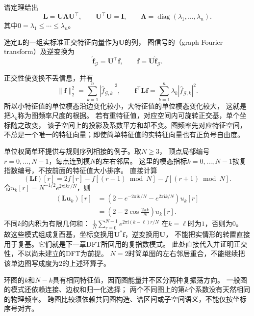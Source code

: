 谱定理给出
\[
  \bm L=\bm U\bm\Lambda\bm U^\top,\qquad
  \bm U^\top\bm U=\bm I,\qquad
  \bm\Lambda=\operatorname{diag}(\lambda_1,\ldots,\lambda_n).
\]
其中\(0=\lambda_1\leq\cdots\leq\lambda_n\)。
\begin{definition}[图傅里叶变换]
  \label{def:signal-analysis-graph-fourier-transform}
  选定\(\bm L\)的一组实标准正交特征向量作为\(\bm U\)的列，
  图信号的（graph Fourier transform）及逆变换为
  \begin{equation}
    \widehat{\bm f}_{\mathcal G}=\bm U^\top\bm f,\qquad
    \bm f=\bm U\widehat{\bm f}_{\mathcal G}.
    \label{eq:signal-analysis-graph-fourier}
  \end{equation}
\end{definition}

正交性使变换不丢信息，并有
\[
  \|\bm f\|_2^2=\sum_{k=1}^n|\widehat f_{\mathcal G,k}|^2,\qquad
  \bm f^\top\bm L\bm f
  =\sum_{k=1}^n\lambda_k|\widehat f_{\mathcal G,k}|^2.
\]
所以小特征值的单位模态沿边变化较小，大特征值的单位模态变化较大，
这就是把\(\lambda_k\)称为图频率尺度的根据。
若有重特征值，对应空间内可旋转正交基，单个坐标随之改变，
该子空间上的投影及系数平方和却不变。图频率先对应特征空间，
不总是一个唯一的特征向量；即使简单特征值的实特征向量也有正负号自由度。

单位权简单环提供与规则序列相接的例子。取\(N\geq3\)，
顶点局部编号\(r=0,\ldots,N-1\)，每点连到模\(N\)的左右邻居。
这里的模态指标\(k=0,\ldots,N-1\)按复指数编号，不按前面的特征值大小排序。
直接计算
\[
  (\bm L\bm f)[r]=2f[r]-f[(r-1)\bmod N]-f[(r+1)\bmod N].
\]
令\(u_k[r]=N^{-1/2}e^{2\pi\mathrm i kr/N}\)，则
\begin{align*}
  (\bm L\bm u_k)[r]
  &=\left(2-e^{-2\pi\mathrm i k/N}-e^{2\pi\mathrm i k/N}\right)u_k[r]\\
  &=\left(2-2\cos\frac{2\pi k}{N}\right)u_k[r].
\end{align*}
不同\(k\)的内积为有限几何和：
\(\frac1N\sum_{r=0}^{N-1}e^{2\pi\mathrm i(k-\ell)r/N}\)
在\(k=\ell\)时为\(1\)，否则为\(0\)。
故这些模式组成复酉基，坐标变换用\(\bm U^*\bm f\)，逆变换用\(\bm U\)，
不能把实情形的转置直接用于复基。它们就是下一章DFT所回用的复指数模式。
此处直接代入并证明正交性，不以尚未建立的DFT为前提。
\(N=2\)时简单图的左右邻居重合，不能继续把该单边图写成度为\(2\)的上述环算子。

环图的\(k\)和\(N-k\)具有相同特征值，因而图能量并不区分两种复振荡方向。
一般图的模式还依赖连接、边权和归一化选择；
两个不同图上的第\(k\)个系数没有天然相同的物理频率。
跨图比较须依赖共同图构造、谱区间或子空间语义，不能仅按坐标序号对齐。

